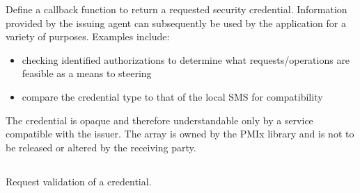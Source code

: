 \begin{arglist}
\end{arglist}

\descr

Define a callback function to return a requested security credential. Information provided by the issuing agent can subsequently be used
by the application for a variety of purposes. Examples include:

\begin{itemize}
    \item checking identified authorizations to determine what requests/operations are feasible as a means to steering 
    \item compare the credential type to that of the local SMS for compatibility
\end{itemize}

\adviceuserstart
The credential is opaque and therefore understandable only by a service compatible with the issuer. The  array is owned by the \ac{PMIx} library and is not to be released or altered by the receiving party.
\adviceuserend


\subsection{}

\summary

Request validation of a credential.

\format


